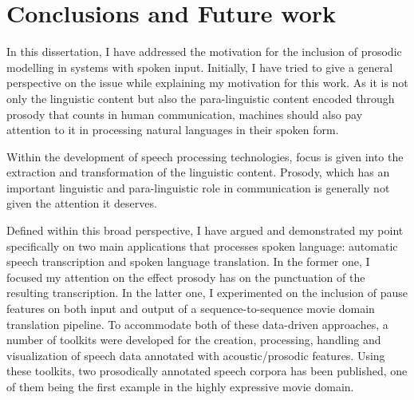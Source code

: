 
\chapter{Conclusions and Future work}
\label{chapter:conclusion}

In this dissertation, I have addressed the motivation for the inclusion of prosodic modelling in systems with spoken input. Initially, I have tried to give a general perspective on the issue while explaining my motivation for this work. As it is not only the linguistic content but also the para-linguistic content encoded through prosody that counts in human communication, machines should also pay attention to it in processing natural languages in their spoken form. 


Within the development of speech processing technologies, focus is given into the extraction and transformation of the linguistic content. Prosody, which has an important linguistic and para-linguistic role in communication is generally not given the attention it deserves. 


Defined within this broad perspective, I have argued and demonstrated my point specifically on two main applications that processes spoken language: automatic speech transcription and spoken language translation. In the former one, I focused my attention on the effect prosody has on the punctuation of the resulting transcription. In the latter one, I experimented on the inclusion of pause features on both input and output of a sequence-to-sequence movie domain translation pipeline. To accommodate both of these data-driven approaches, a number of toolkits were developed for the creation, processing, handling and visualization of speech data annotated with acoustic/prosodic features. Using these toolkits, two prosodically annotated speech corpora has been published, one of them being the first example in the highly expressive movie domain. 

